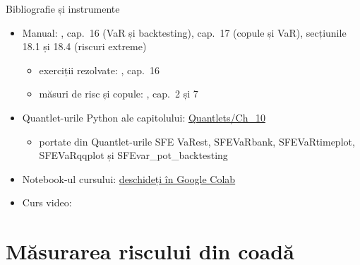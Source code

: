 \begin{frame}{Bibliografie și instrumente}
\itemsize{\small}
\begin{itemize}
    \item Manual: , cap.~16 (VaR și backtesting), cap.~17 (copule și VaR), secțiunile 18.1 și 18.4 (riscuri extreme)
    \begin{itemize}
        \item exerciții rezolvate: , cap.~16
        \item măsuri de risc și copule: , cap.~2 și 7
    \end{itemize}
    \item Quantlet-urile Python ale capitolului: \href{https://github.com/danpele/SFM/tree/main/Quantlets/Ch_10}{Quantlets/Ch\_10}
    \begin{itemize}
        \item portate din Quantlet-urile SFE VaRest, SFEVaRbank, SFEVaRtimeplot, SFEVaRqqplot și SFEvar\_pot\_backtesting
    \end{itemize}
    \item Notebook-ul cursului: \href{\colaburl{notebooks/EN/chapter10_lecture_notebook.ipynb}}{deschideți în Google Colab}
    \item Curs video: 
\end{itemize}
\end{frame}


\section{Măsurarea riscului din coadă}

